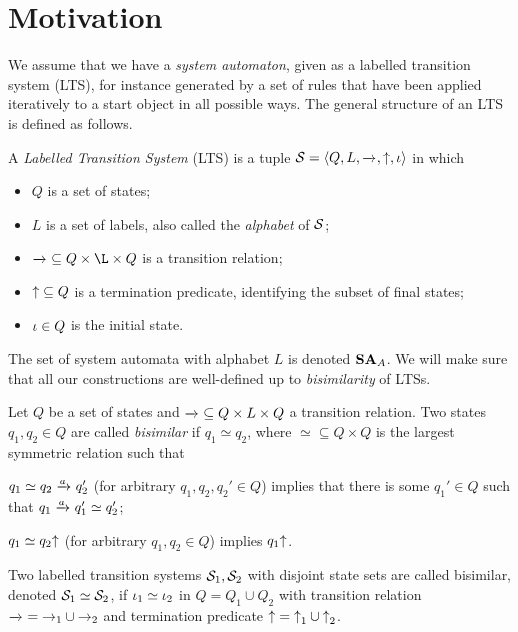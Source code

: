 \section{Motivation}
\label{sec:motivation}

We assume that we have a \emph{system automaton}, given as a labelled transition system (LTS), for instance generated by a set of rules that have been applied iteratively to a start object in all possible ways. The general structure of an LTS is defined as follows.

\begin{definition}[LTS]\label{defL;ts}
A \emph{Labelled Transition System} (LTS) is a tuple $\cS=\tupof{Q, L, {\trans{}}, {\final}, \qinit}$ in which
\begin{itemize}
\item $Q$ is a set of states;
\item $L$ is a set of labels, also called the \emph{alphabet} of $\mathcal{S}$;
\item ${\trans{}}\subseteq Q\times\L\times Q$ is a transition relation;
\item ${{\uparrow}}\subseteq Q$ is a termination predicate, identifying the subset of final states;
\item $\iota\in Q$ is the initial state.
\end{itemize}
\end{definition}
%
The set of system automata with alphabet $L$ is denoted $\mathbf{SA}_A$. We will make sure that all our constructions are well-defined up to \emph{bisimilarity} of LTSs.
%
\begin{definition}[bisimilarity]\label{def:bisimilarity}
Let $Q$ be a set of states and ${\trans{}}\subseteq Q\times L\times Q$ a transition relation. Two states $q_1,q_2\in Q$ are called \emph{bisimilar} if $q_1\simeq q_2$, where ${\simeq}\subseteq Q\times Q$ is the largest symmetric relation such that
\begin{inumerate}
\item $q_1\simeq q_2\trans a q_2'$ (for arbitrary $q_1,q_2,q_2'\in Q$) implies that there is some $q_1'\in Q$ such that $q_1\trans a q_1'\simeq q_2'$;
\item $q_1\simeq q_2{\uparrow}$ (for arbitrary $q_1,q_2\in Q$) implies $q_1{\uparrow}$.
\end{inumerate}

Two labelled transition systems $\mathcal{S}_1,\mathcal{S}_2$ with disjoint state sets are called bisimilar, denoted $\mathcal{S}_1\simeq \mathcal{S}_2$, if $\iota_1\simeq \iota_2$ in $Q=Q_1\cup Q_2$ with transition relation ${\trans{}}={\rightarrow_1}\cup {\rightarrow_2}$ and termination predicate ${{\uparrow}}={{\uparrow}_1}\cup {{\uparrow}_2}$.
\end{definition}
